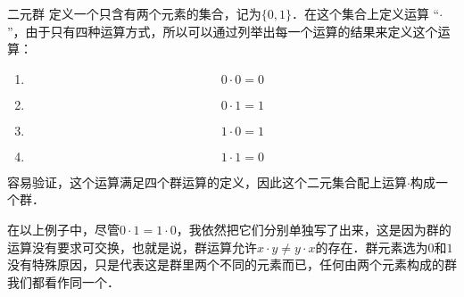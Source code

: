 \begin{example}{二元群}\label{Group_ex1}
定义一个只含有两个元素的集合，记为$\{0, 1\}$．在这个集合上定义运算 “$\cdot$”，由于只有四种运算方式，所以可以通过列举出每一个运算的结果来定义这个运算：
\begin{enumerate}
\item $$0\cdot0=0$$
\item $$0\cdot1=1$$
\item $$1\cdot0=1$$
\item $$1\cdot1=0$$
\end{enumerate}



容易验证，这个运算满足四个群运算的定义，因此这个二元集合配上运算$\cdot$构成一个群．

\end{example}

在以上例子中，尽管$0\cdot1=1\cdot0$，我依然把它们分别单独写了出来，这是因为群的运算没有要求可交换，也就是说，群运算允许$x\cdot y\neq y\cdot x$的存在．群元素选为$0$和$1$没有特殊原因，只是代表这是群里两个不同的元素而已，任何由两个元素构成的群我们都看作同一个．